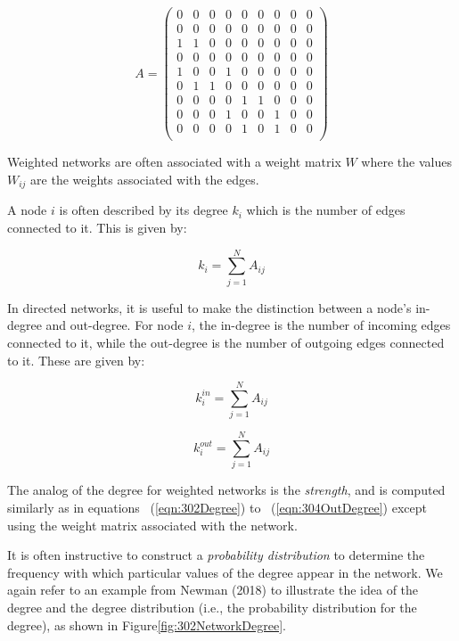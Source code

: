 \documentclass[12pt,letterpaper]{report}
\begin{document}
\begin{equation}
\label{eqn:301A} A = 
\begin{pmatrix}
0 & 0 & 0 & 0 & 0 & 0 & 0 & 0 & 0 \\
0 & 0 & 0 & 0 & 0 & 0 & 0 & 0 & 0 \\
1 & 1 & 0 & 0 & 0 & 0 & 0 & 0 & 0 \\
0 & 0 & 0 & 0 & 0 & 0 & 0 & 0 & 0 \\
1 & 0 & 0 & 1 & 0 & 0 & 0 & 0 & 0 \\
0 & 1 & 1 & 0 & 0 & 0 & 0 & 0 & 0 \\
0 & 0 & 0 & 0 & 1 & 1 & 0 & 0 & 0 \\
0 & 0 & 0 & 1 & 0 & 0 & 1 & 0 & 0 \\
0 & 0 & 0 & 0 & 1 & 0 & 1 & 0 & 0 \\
\end{pmatrix}
\end{equation}

	Weighted networks are often associated with a weight matrix $W$ where the values $W_{ij}$  are the weights associated with the edges.
	
	A node $i$ is often described by its degree $k_i$ which is the number of edges connected to it. This is given by:

\begin{equation}
\label{eqn:302Degree} k_i = \sum_{j=1}^{N} A_{ij}
\end{equation}	

	In directed networks, it is useful to make the distinction between a node's in-degree and out-degree. For node $i$, the in-degree is the number of incoming edges connected to it, while the out-degree is the number of outgoing edges connected to it. These are given by:

\begin{equation}
\label{eqn:303InDegree} k_i^{in} = \sum_{j=1}^{N} A_{ij}
\end{equation}	

\begin{equation}
\label{eqn:304OutDegree} k_i^{out} = \sum_{j=1}^{N} A_{ij}
\end{equation}	

	The analog of the degree for weighted networks is the \textit{strength}, and is computed similarly as in equations ~(\ref{eqn:302Degree}) to ~(\ref{eqn:304OutDegree}) except using the weight matrix associated with the network.
	
	It is often instructive to construct a \textit{probability distribution} to determine the frequency with which particular values of the degree appear in the network. We again refer to an example from Newman (2018) to illustrate the idea of the degree and the degree distribution (i.e., the probability distribution for the degree), as shown in Figure\ref{fig:302NetworkDegree}. 
\end{document}
